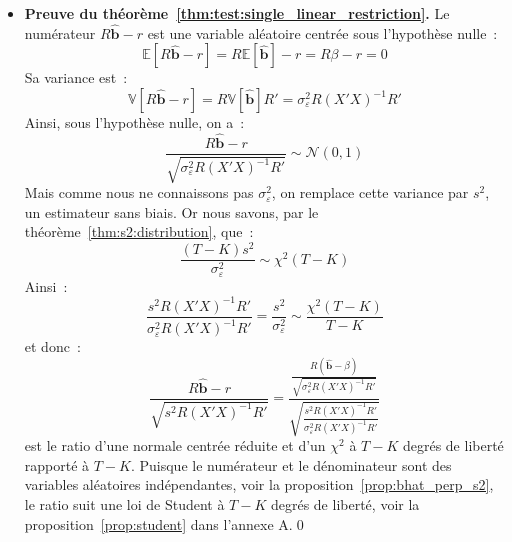 \documentclass[10pt]{beamer}
\begin{document}
\begin{notes}

  \begin{itemize}

  \item \textbf{Preuve du théorème~\ref{thm:test:single_linear_restriction}.} Le numérateur $R\hat{\mathbf b}-r$ est une variable aléatoire centrée sous l'hypothèse nulle~:
    \[
      \mathbb E \left[ R\hat{\mathbf b} - r \right] = R\mathbb E\left[ \hat{\mathbf b} \right] - r = R\beta-r = 0
    \]
    Sa variance est~:
    \[
      \mathbb V\left[ R\hat{\mathbf b}-r\right] = R\mathbb V\left[ \hat{\mathbf b} \right] R' = \sigma_{\varepsilon}^2R(X'X)^{-1}R'
    \]
    Ainsi, sous l'hypothèse nulle, on a~:
    \[
      \frac{R\hat{\mathbf b}-r}{\sqrt{\sigma_{\varepsilon}^2R(X'X)^{-1}R'}} \sim \mathcal N(0,1)
    \]
    Mais comme nous ne connaissons pas $\sigma_{\varepsilon}^2$, on remplace cette variance par $s^2$, un estimateur sans biais. Or nous savons, par le théorème~\ref{thm:s2:distribution}, que~:
    \[
      \frac{(T-K)s^2}{\sigma_{\varepsilon}^2} \sim \chi^2(T-K)
    \]
    Ainsi~:
    \[
      \frac{s^2R(X'X)^{-1}R'}{\sigma_{\varepsilon}^2R(X'X)^{-1}R'} = \frac{s^2}{\sigma_{\varepsilon}^2} \sim \frac{\chi^2(T-K)}{T-K}
    \]
    et donc~:
    \[
      \frac{R\hat{\mathbf b}-r}{\sqrt{s^2R(X'X)^{-1}R'}} =
      \frac{\frac{R\left( \hat{\mathbf b} - \beta \right)}{\sqrt{\sigma_{\varepsilon}^2R(X'X)^{-1}R'}}}
      {\sqrt{\frac{s^2R(X'X)^{-1}R'}{\sigma_{\varepsilon}^2R(X'X)^{-1}R'}}}
    \]
    est le ratio d'une normale centrée réduite et d'un $\chi^2$ à $T-K$ degrés de liberté rapporté à $T-K$. Puisque le numérateur et le dénominateur sont des variables aléatoires indépendantes, voir la proposition~\ref{prop:bhat_perp_s2}, le ratio suit une loi de Student à $T-K$ degrés de liberté, voir la proposition~\ref{prop:student} dans l'annexe A.\qed

  \end{itemize}

\end{notes}
\end{document}
